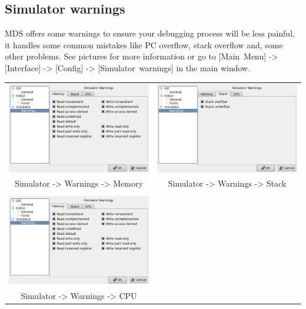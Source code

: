     \subsection{Simulator warnings}
        MDS offers some warnings to ensure your debugging process will be less painful, it handles some common mistakes
        like PC overflow, stack overflow and, some other problems. See pictures for more information or go to
        [Main~Menu] -> [Interface] -> [Config] -> [Simulator~warnings] in the main window.

        \begin{table}[h!]
            \begin{tabular}{cc}
                \includegraphics[width=.45\textwidth]{img/interface4.png}
                    &
                \includegraphics[width=.45\textwidth]{img/interface5.png}
                \\ Simulator -> Warnings -> Memory & Simulator -> Warnings -> Stack
                \\
                \\ \includegraphics[width=.5\textwidth]{img/interface4.png}
                \\ Simulator -> Warnings -> CPU
            \end{tabular}
        \end{table}

